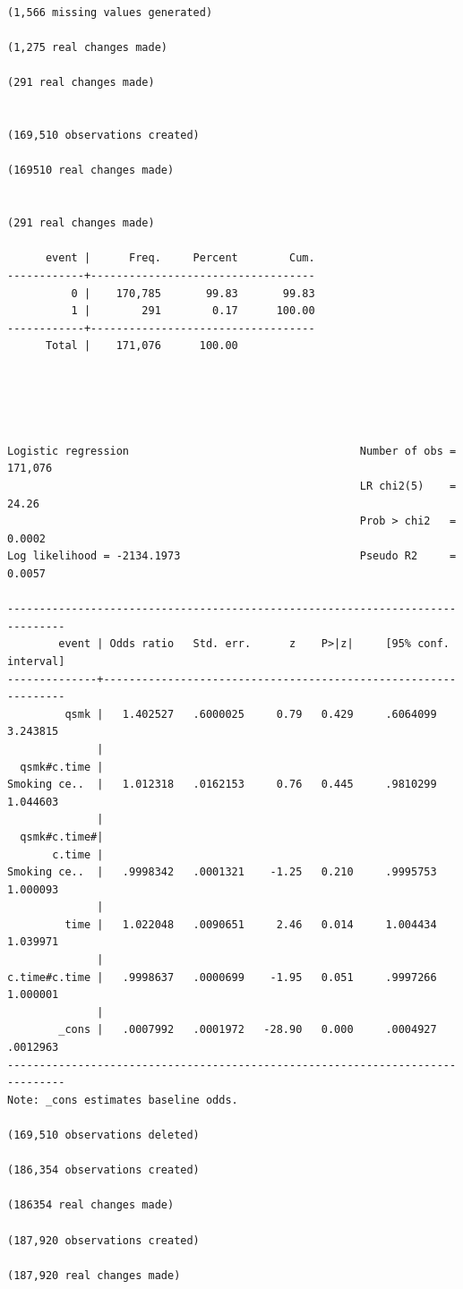 \documentclass[
  10pt,
]{book}
\begin{document}
\begin{verbatim}
(1,566 missing values generated)

(1,275 real changes made)

(291 real changes made)


(169,510 observations created)

(169510 real changes made)


(291 real changes made)

      event |      Freq.     Percent        Cum.
------------+-----------------------------------
          0 |    170,785       99.83       99.83
          1 |        291        0.17      100.00
------------+-----------------------------------
      Total |    171,076      100.00





Logistic regression                                    Number of obs = 171,076
                                                       LR chi2(5)    =   24.26
                                                       Prob > chi2   =  0.0002
Log likelihood = -2134.1973                            Pseudo R2     =  0.0057

-------------------------------------------------------------------------------
        event | Odds ratio   Std. err.      z    P>|z|     [95% conf. interval]
--------------+----------------------------------------------------------------
         qsmk |   1.402527   .6000025     0.79   0.429     .6064099    3.243815
              |
  qsmk#c.time |
Smoking ce..  |   1.012318   .0162153     0.76   0.445     .9810299    1.044603
              |
  qsmk#c.time#|
       c.time |
Smoking ce..  |   .9998342   .0001321    -1.25   0.210     .9995753    1.000093
              |
         time |   1.022048   .0090651     2.46   0.014     1.004434    1.039971
              |
c.time#c.time |   .9998637   .0000699    -1.95   0.051     .9997266    1.000001
              |
        _cons |   .0007992   .0001972   -28.90   0.000     .0004927    .0012963
-------------------------------------------------------------------------------
Note: _cons estimates baseline odds.

(169,510 observations deleted)

(186,354 observations created)

(186354 real changes made)

(187,920 observations created)

(187,920 real changes made)







\end{verbatim}
\end{document}
